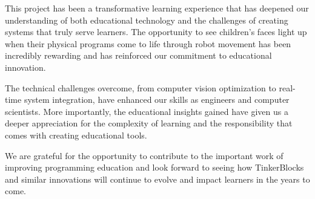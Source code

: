 This project has been a transformative learning experience that has deepened our understanding of both educational technology and the challenges of creating systems that truly serve learners. The opportunity to see children's faces light up when their physical programs come to life through robot movement has been incredibly rewarding and has reinforced our commitment to educational innovation.

The technical challenges overcome, from computer vision optimization to real-time system integration, have enhanced our skills as engineers and computer scientists. More importantly, the educational insights gained have given us a deeper appreciation for the complexity of learning and the responsibility that comes with creating educational tools.

We are grateful for the opportunity to contribute to the important work of improving programming education and look forward to seeing how TinkerBlocks and similar innovations will continue to evolve and impact learners in the years to come.